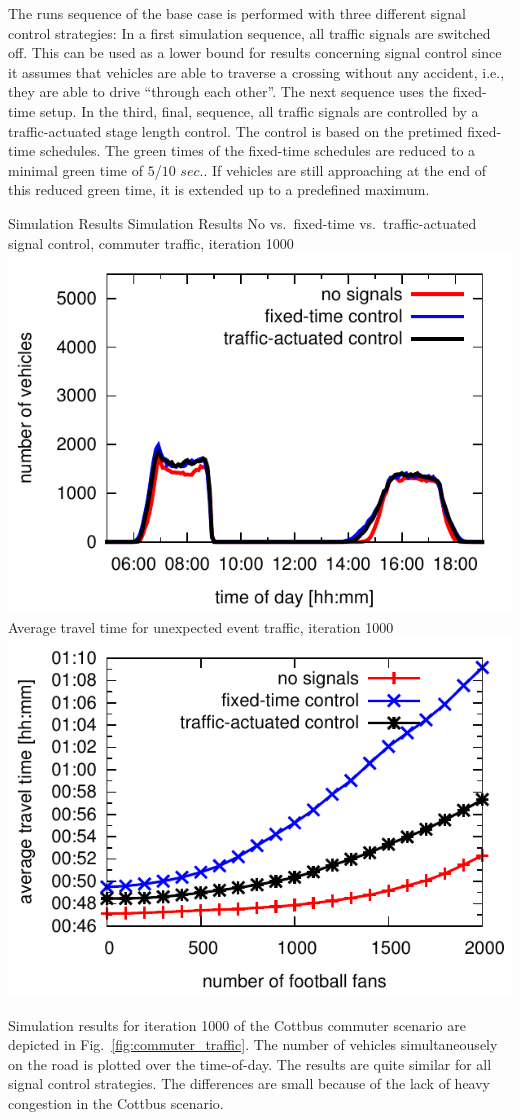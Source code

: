 %
The runs sequence of the base case is performed with three different signal control strategies:
%
In a first simulation sequence, all traffic signals are switched off. This can be used as a lower bound for results concerning signal control since it assumes that vehicles are able to traverse a crossing without any accident, i.e., they are able to drive ``through each other''. 
%
The next sequence uses the fixed-time setup. 
%
In the third, final, sequence, all traffic signals are controlled by a traffic-actuated stage length control. 
The control is based on the pretimed fixed-time schedules. 
The green times of the fixed-time schedules are reduced to a minimal green time of $5$/$10$ $sec.$. 
If vehicles are still approaching at the end of this reduced green time, it is extended up to a predefined maximum. 

\createfigure%
{Simulation Results}%
{Simulation Results}%
{\label{fig:results_histogram}}
{%
  \createsubfigure%
  {No vs.~fixed-time vs.~traffic-actuated signal control, commuter traffic, iteration 1000}%
	{\includegraphics[width=0.48\linewidth]{extending/figures/signalslanes/leg_histogram_1292_1293_1291_it_1000.pdf}}
  {\label{fig:commuter_traffic}}%
  \createsubfigure%
	{Average travel time for unexpected event traffic, iteration 1000}
	{\includegraphics[width=0.48\linewidth]{extending/figures/signalslanes/average_travel_time_1220_1222.pdf}}
	{\label{fig:unexpected_event}}
}%
{\citet{Grether2014PhD}}

Simulation results for iteration 1000 of the Cottbus commuter scenario are depicted in
Fig.~\ref{fig:commuter_traffic}. 
The number of vehicles simultaneousely on the road is plotted over the time-of-day. 
The results are quite similar for all signal control strategies. 
The differences are small because of the lack of heavy congestion in the Cottbus scenario. 

